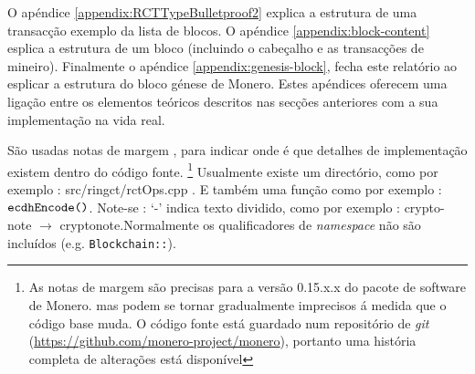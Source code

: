 O apéndice \ref{appendix:RCTTypeBulletproof2} explica a estrutura de uma transacção exemplo da lista de blocos. O apéndice \ref{appendix:block-content} esplica a estrutura de um bloco (incluindo o cabeçalho e as transacções de mineiro). Finalmente o apéndice \ref{appendix:genesis-block}, fecha este relatório ao esplicar a estrutura do bloco génese de Monero. Estes apéndices oferecem uma ligação entre os elementos teóricos descritos nas secções anteriores com a sua implementação na vida real.
    

São usadas notas de margem , para indicar onde é que detalhes de implementação existem dentro do código fonte. 
\footnote{As notas de margem são precisas para a versão 0.15.x.x do pacote de software de Monero. mas podem se tornar gradualmente imprecisos á medida que o código base muda. O código fonte está guardado num repositório de {\em git} (\url{https://github.com/monero-project/monero}), portanto uma história completa de alterações está disponível}
Usualmente existe um directório, como por exemplo : src/ringct/rctOps.cpp . E também uma função como por exemplo : \(\textrm{{\tt ecdhEncode()}}\). Note-se : `-' indica texto dividido, como por exemplo : crypto- note $\rightarrow$ cryptonote.\newline Normalmente os qualificadores de {\em namespace} não são incluídos (e.g. {\tt Blockchain::}).




